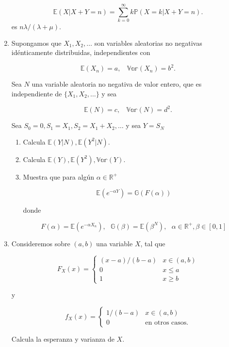 \documentclass[a4paper,11pt]{report}
\begin{document}
\begin{enumerate}
\[
\mathbb{E}(X| X +Y = n) = \displaystyle\sum_{k=0}^{\infty}k\mathbb{P}(X = k|X +Y =n).
\]
es $n\lambda/(\lambda + \mu)$.
\item Supongamos que $X_1, X_2, \dots$ son variables aleatorias no negativas id\'enticamente distribuidas, independientes con

\[
\mathbb{E}(X_n) = a, \ \ \ \ \mathbb{Var}(X_n) = b^2.
\]

Sea $N$ una variable aleatoria no negativa de valor entero, que es independiente de $\{ X_1, X_2, \dots\}$ y sea 

\[
\mathbb{E}(N) = c, \ \ \ \ \mathbb{Var}(N) = d^2.
\]

\vspace{0.2cm}

Sea $S_0 = 0, S_1 = X_1, S_2 = X_1 + X_2, \dots $ y sea $Y = S_N$

\begin{enumerate}
	\item Calcula $\mathbb{E}(Y|N), \mathbb{E}(Y^2|N)$.
	\item Calcula $\mathbb{E}(Y), \mathbb{E}(Y^2), \mathbb{Var}(Y)$.
	\item Muestra que para alg\'un $\alpha \in \mathbb{R^{+}}$
	
	\[
	\mathbb{E}(e^{-\alpha Y}) = \mathbb{G}(F(\alpha))
	\]
	
\vspace{0.2cm}

donde

\vspace{0.2cm}

\[
F(\alpha) = \mathbb{E}(e^{-\alpha X_n}), \ \ \ \mathbb{G}(\beta) = \mathbb{E}(\beta^N), \ \ \ \alpha \in \mathbb{R^{+}}, \beta \in [0,1]
\]
\end{enumerate}
\item Consideremos sobre $(a ,b)$ una variable $X$, tal que 

$$
F_{X}(x) = \begin{cases}
(x -a)/(b -a ) & x\in (a,b) \\
0				& x\leq a\\
1			& 	x \geq b
\end{cases}
$$

y 

$$
f_{X}(x) = \begin{cases}
1/(b -a) & x \in (a, b)\\
0 & \text{en otros casos}.
\end{cases}
$$

Calcula la esperanza y varianza de $X$.


\end{enumerate}
\end{document}
